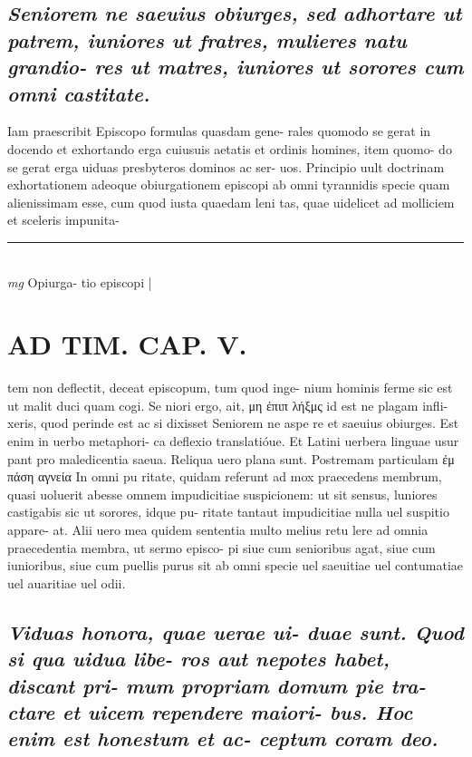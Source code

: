 \documentclass{article}
\begin{document}
\begin{pages}
\subsection*{\textit{Seniorem ne saeuius obiurges, sed adhortare ut patrem, iuniores ut fratres, mulieres natu grandio- res ut matres, iuniores ut sorores cum omni castitate. }}\pstart Iam praescribit Episcopo formulas quasdam gene- rales quomodo se gerat in docendo et exhortando erga cuiusuis aetatis et ordinis homines, item quomo- do se gerat erga uiduas presbyteros dominos ac ser- uos. Principio uult doctrinam exhortationem adeoque  obiurgationem episcopi ab omni tyrannidis specie quam alienissimam esse, cum quod iusta quaedam leni tas, quae uidelicet ad molliciem et sceleris impunita-  \pend
\vspace{0.5cm}\noindent
\vspace{0.2cm}\rule{1cm}{0.2pt}\\ 
\hspace{0.2cm}\textit{mg}
\footnotesize Opiurga- tio episcopi 
\normalsize| 
\section*{AD TIM. CAP. V. }
\marginpar{[ p.148 ]}\pstart tem non deflectit, deceat episcopum, tum quod inge- nium hominis ferme sic est ut malit duci quam cogi. Se niori ergo, ait, μη ἐπιπ λήξμς id est ne plagam infli- xeris, quod perinde est ac si dixisset Seniorem ne aspe re et saeuius obiurges. Est enim in uerbo metaphori- ca deflexio translatióue. Et Latini uerbera linguae usur pant pro maledicentia saeua. Reliqua uero plana sunt. Postremam particulam ἐμ πάση αγνεία In omni pu ritate, quidam referunt ad mox praecedens membrum, quasi uoluerit abesse omnem impudicitiae suspicionem: ut sit sensus, luniores castigabis sic ut sorores, idque pu- ritate tantaut impudicitiae nulla uel suspitio appare- at. Alii uero mea quidem sententia multo melius retu lere ad omnia praecedentia membra, ut sermo episco- pi siue cum senioribus agat, siue cum iunioribus, siue cum puellis purus sit ab omni specie uel saeuitiae uel contumatiae uel auaritiae uel odii.  \pend
{}
{}
\subsection*{\textit{Viduas honora, quae uerae ui- duae sunt. Quod si qua uidua libe- ros aut nepotes habet, discant pri- mum propriam domum pie tra- ctare et uicem rependere maiori- bus. Hoc enim est honestum et ac- ceptum coram deo. }}

\end{pages}
\end{document}
